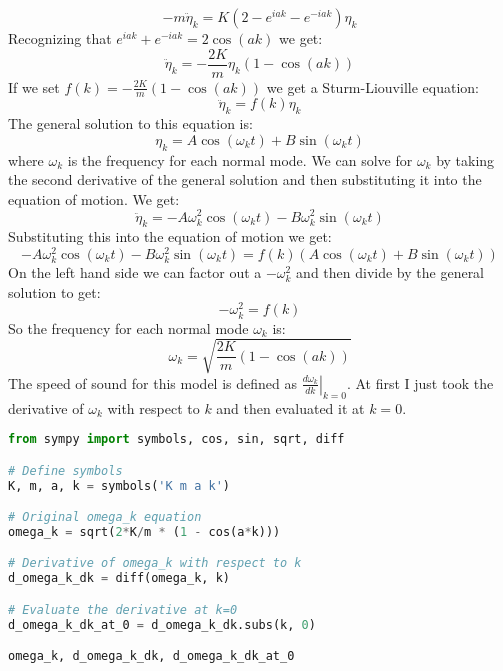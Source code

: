 \documentclass[12pt]{article}
\begin{document}
\begin{equation}
  -m \ddot{\eta}_{k} = K(2 - e^{i a k} - e^{-i a k})\eta_{k}
\end{equation}
Recognizing that $e^{i a k} + e^{-i a k} = 2 \cos(a k)$ we get:
\begin{equation}
\ddot{\eta}_{k} = -\frac{2K}{m} \eta_{k} (1 - \cos(a k)) 
\end{equation}
If we set $f(k) = - \frac{2K}{m} (1 - \cos(a k))$ we get a Sturm-Liouville equation:
\begin{equation}
\ddot{\eta}_{k} = f(k) \eta_{k}
\end{equation}
The general solution to this equation is:
\begin{equation}
\eta_{k} = A \cos(\omega_k t) + B \sin(\omega_k t)
\end{equation}
where $\omega_k$ is the frequency for each normal mode. We can solve for $\omega_k$ by taking the second derivative of the general solution and then substituting it into the equation of motion. We get:
\begin{equation}
\ddot{\eta}_{k} = -A \omega_k^2 \cos(\omega_k t) - B \omega_k^2 \sin(\omega_k t)
\end{equation}
Substituting this into the equation of motion we get:
\begin{equation}
-A \omega_k^2 \cos(\omega_k t) - B \omega_k^2 \sin(\omega_k t) = f(k) (A \cos(\omega_k t) + B \sin(\omega_k t))
\end{equation}
On the left hand side we can factor out a $-\omega_k^2$ and then divide by the general solution to get:
\begin{equation}
-\omega_k^2 = f(k)
\end{equation}
So the frequency for each normal mode $\omega_{k}$ is:
\begin{equation}
\omega_k = \sqrt{\frac{2K}{m} (1 - \cos(a k))}
\end{equation}
The speed of sound for this model is defined as $\left.\frac{d \omega_{k}}{d k}\right|_{k=0}$. At first I just took the derivative of $\omega_k$ with respect to $k$ and then evaluated it at $k=0$.
\begin{lstlisting}[language=Python]
from sympy import symbols, cos, sin, sqrt, diff

# Define symbols
K, m, a, k = symbols('K m a k')

# Original omega_k equation
omega_k = sqrt(2*K/m * (1 - cos(a*k)))

# Derivative of omega_k with respect to k
d_omega_k_dk = diff(omega_k, k)

# Evaluate the derivative at k=0
d_omega_k_dk_at_0 = d_omega_k_dk.subs(k, 0)

omega_k, d_omega_k_dk, d_omega_k_dk_at_0

\end{lstlisting}
\end{document}
